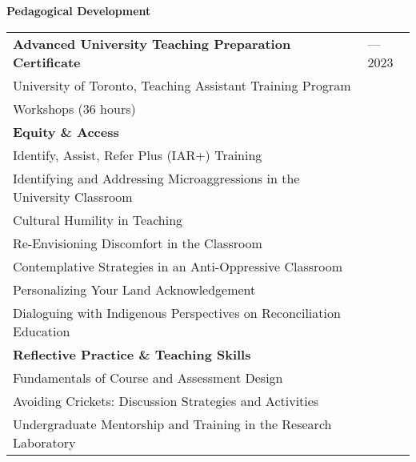 \documentclass[letterpaper,11pt,oneside]{article}
\begin{document}





\newpage

\noindent\Large{\textbf{Pedagogical Development}}
\normalsize
\bigskip


\def\arraystretch{1.1}
\noindent \begin{longtable}{@{} >{\raggedright\arraybackslash}p{15.5cm} >{\raggedright\arraybackslash}p{1.7cm}}

 \textbf{Advanced University Teaching Preparation Certificate}  & 2021---2023\\
University of Toronto, Teaching Assistant Training Program \\
Workshops (36 hours) & \\
\hspace{2mm} \textbf{Equity \& Access} \\
  \hspace{5mm} Identify, Assist, Refer Plus (IAR+) Training & \\
  \hspace{5mm} Identifying and Addressing Microaggressions in the University Classroom & \\
  \hspace{5mm} Cultural Humility in Teaching & \\
  \hspace{5mm} Re-Envisioning Discomfort in the Classroom & \\
  \hspace{5mm} Contemplative Strategies in an Anti-Oppressive Classroom & \\
  \hspace{5mm} Personalizing Your Land Acknowledgement & \\
  \hspace{5mm} Dialoguing with Indigenous Perspectives on Reconciliation Education & \\
\hspace{2mm} \textbf{Reflective Practice \& Teaching Skills} \\
  \hspace{5mm} Fundamentals of Course and Assessment Design & \\
  \hspace{5mm} Avoiding Crickets: Discussion Strategies and Activities & \\
  \hspace{5mm} Undergraduate Mentorship and Training in the Research Laboratory & \\

\end{longtable}
\end{document}
